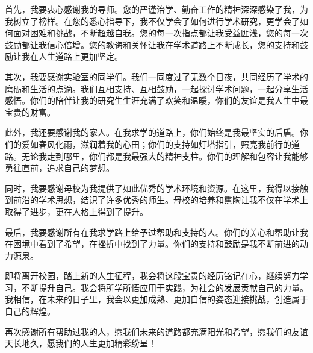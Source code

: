 \begin{ack}
首先，我要衷心感谢我的导师。您的严谨治学、勤奋工作的精神深深感染了我，为我树立了榜样。在您的悉心指导下，我不仅学会了如何进行学术研究，更学会了如何面对困难和挑战，不断超越自我。您的每一次指点都让我受益匪浅，您的每一次鼓励都让我信心倍增。您的教诲和关怀让我在学术道路上不断成长，您的支持和鼓励让我在人生道路上更加坚定。

其次，我要感谢实验室的同学们。我们一同度过了无数个日夜，共同经历了学术的磨砺和生活的点滴。我们互相支持、互相鼓励，一起探讨学术问题，一起分享生活感悟。你们的陪伴让我的研究生生涯充满了欢笑和温暖，你们的友谊是我人生中最宝贵的财富。

此外，我还要感谢我的家人。在我求学的道路上，你们始终是我最坚实的后盾。你们的爱如春风化雨，滋润着我的心田；你们的支持如灯塔指引，照亮我前行的道路。无论我走到哪里，你们都是我最强大的精神支柱。你们的理解和包容让我能够勇往直前，追求自己的梦想。

同时，我要感谢母校为我提供了如此优秀的学术环境和资源。在这里，我得以接触到前沿的学术思想，结识了许多优秀的师生。母校的培养和熏陶让我不仅在学术上取得了进步，更在人格上得到了提升。

最后，我要感谢所有在我求学路上给予过帮助和支持的人。你们的关心和帮助让我在困境中看到了希望，在挫折中找到了力量。你们的支持和鼓励是我不断前进的动力源泉。

即将离开校园，踏上新的人生征程，我会将这段宝贵的经历铭记在心，继续努力学习，不断提升自己。我会将所学所悟应用于实践，为社会的发展贡献自己的力量。我相信，在未来的日子里，我会以更加成熟、更加自信的姿态迎接挑战，创造属于自己的辉煌。

再次感谢所有帮助过我的人，愿我们未来的道路都充满阳光和希望，愿我们的友谊天长地久，愿我们的人生更加精彩纷呈！

\end{ack}
